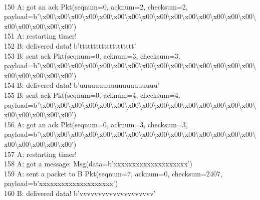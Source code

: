 \documentclass{article}
\begin{document}
{\\
150 A: got an ack Pkt(seqnum=0, acknum=2, checksum=2,
payload=b'\textbackslash{}x00\textbackslash{}x00\textbackslash{}x00\textbackslash{}x00\textbackslash{}x00\textbackslash{}x00\textbackslash{}x00\textbackslash{}x00\textbackslash{}x00\textbackslash{}x00\textbackslash{}x00\textbackslash{}x00\textbackslash{}x00\textbackslash{}x00\textbackslash{}x00\textbackslash{}x00\textbackslash{}x00\textbackslash{}x00\textbackslash{}x00\textbackslash{}x00')
\\
151 A: restarting timer! \\
152 B: delivered data! b'tttttttttttttttttttt' \\
153 B: sent ack Pkt(seqnum=0, acknum=3, checksum=3,
payload=b'\textbackslash{}x00\textbackslash{}x00\textbackslash{}x00\textbackslash{}x00\textbackslash{}x00\textbackslash{}x00\textbackslash{}x00\textbackslash{}x00\textbackslash{}x00\textbackslash{}x00\textbackslash{}x00\textbackslash{}x00\textbackslash{}x00\textbackslash{}x00\textbackslash{}x00\textbackslash{}x00\textbackslash{}x00\textbackslash{}x00\textbackslash{}x00\textbackslash{}x00')
\\
154 B: delivered data! b'uuuuuuuuuuuuuuuuuuuu' \\
155 B: sent ack Pkt(seqnum=0, acknum=4, checksum=4,
payload=b'\textbackslash{}x00\textbackslash{}x00\textbackslash{}x00\textbackslash{}x00\textbackslash{}x00\textbackslash{}x00\textbackslash{}x00\textbackslash{}x00\textbackslash{}x00\textbackslash{}x00\textbackslash{}x00\textbackslash{}x00\textbackslash{}x00\textbackslash{}x00\textbackslash{}x00\textbackslash{}x00\textbackslash{}x00\textbackslash{}x00\textbackslash{}x00\textbackslash{}x00')
\\
156 A: got an ack Pkt(seqnum=0, acknum=3, checksum=3,
payload=b'\textbackslash{}x00\textbackslash{}x00\textbackslash{}x00\textbackslash{}x00\textbackslash{}x00\textbackslash{}x00\textbackslash{}x00\textbackslash{}x00\textbackslash{}x00\textbackslash{}x00\textbackslash{}x00\textbackslash{}x00\textbackslash{}x00\textbackslash{}x00\textbackslash{}x00\textbackslash{}x00\textbackslash{}x00\textbackslash{}x00\textbackslash{}x00\textbackslash{}x00')
\\
157 A: restarting timer! \\
158 A: got a message: Msg(data=b'xxxxxxxxxxxxxxxxxxxx') \\
159 A: sent a packet to B Pkt(seqnum=7, acknum=0, checksum=2407,
payload=b'xxxxxxxxxxxxxxxxxxxx') \\
160 B: delivered data! b'vvvvvvvvvvvvvvvvvvvv' \\
}
\end{document}
